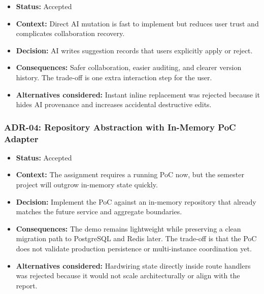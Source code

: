 \begin{itemize}[leftmargin=1.3em]
    \item \textbf{Status:} Accepted
    \item \textbf{Context:} Direct AI mutation is fast to implement but reduces user trust and complicates collaboration recovery.
    \item \textbf{Decision:} AI writes suggestion records that users explicitly apply or reject.
    \item \textbf{Consequences:} Safer collaboration, easier auditing, and clearer version history. The trade-off is one extra interaction step for the user.
    \item \textbf{Alternatives considered:} Instant inline replacement was rejected because it hides AI provenance and increases accidental destructive edits.
\end{itemize}

\subsubsection{ADR-04: Repository Abstraction with In-Memory PoC Adapter}

\begin{itemize}[leftmargin=1.3em]
    \item \textbf{Status:} Accepted
    \item \textbf{Context:} The assignment requires a running PoC now, but the semester project will outgrow in-memory state quickly.
    \item \textbf{Decision:} Implement the PoC against an in-memory repository that already matches the future service and aggregate boundaries.
    \item \textbf{Consequences:} The demo remains lightweight while preserving a clean migration path to PostgreSQL and Redis later. The trade-off is that the PoC does not validate production persistence or multi-instance coordination yet.
    \item \textbf{Alternatives considered:} Hardwiring state directly inside route handlers was rejected because it would not scale architecturally or align with the report.
\end{itemize}
